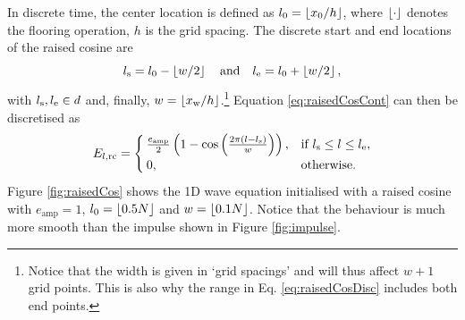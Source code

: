 In discrete time, the center location is defined as $l_0 = \floor[x_0 / h]$, where $\floor[\cdot]$ denotes the flooring operation, $h$ is the grid spacing. The discrete start and end locations of the raised cosine are
\begin{equation}\label{eq:lsle}
    l_\text{s} = l_0 - \floor[w/2]\qaq l_\etxt = l_0 + \floor[w/2],
\end{equation}
with $l_{\text{s}}, l_{\text{e}}\in d$ and, finally, $w = \floor[x_\text{w} / h]$.\footnote{Notice that the width is given in `grid spacings' and will thus affect $w+1$ grid points. This is also why the range in Eq. \eqref{eq:raisedCosDisc} includes both end points.} Equation \eqref{eq:raisedCosCont} can then be discretised as
\begin{equation}\label{eq:raisedCosDisc}
    E_{l, \text{rc}} =
    \begin{cases}
        \frac{e_\text{amp}}{2}\left(1 - \cos\left(\frac{2\pi (l - l_{\text{s}})}{w}\right)\right), & \text{if } l_{\text{s}} \leq l \leq l_{\text{e}},\\
        0, & \text{otherwise}.
    \end{cases}
\end{equation}
Figure \ref{fig:raisedCos} shows the 1D wave equation initialised with a raised cosine with $e_\text{amp} = 1$, $l_0 = \floor[0.5N]$ and $w = \floor[0.1N]$. Notice that the behaviour is much more smooth than the impulse shown in Figure \ref{fig:impulse}.


